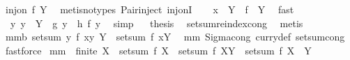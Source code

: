 \begin{isabellebody}
\isamarkupfalse%
\ {\isachardoublequoteopen}inj{\isacharunderscore}on\ {\isacharquery}f\ Y{\isachardoublequoteclose}\ \isamarkupfalse%
\ {\isacharparenleft}metis{\isacharparenleft}no{\isacharunderscore}types{\isacharparenright}\ Pair{\isacharunderscore}inject\ inj{\isacharunderscore}onI{\isacharparenright}\ \isanewline
{}\isamarkupfalse%
\ \isamarkupfalse%
\ {\isachardoublequoteopen}{\isacharbraceleft}x{\isacharbraceright}\ {\isasymtimes}\ Y\ {\isacharequal}\ {\isacharquery}f\ {\isacharbackquote}\ Y{\isachardoublequoteclose}\ \isamarkupfalse%
\ fast\isanewline
{}\isamarkupfalse%
\ \isamarkupfalse%
\ {\isachardoublequoteopen}{\isasymforall}\ y{\isachardot}\ y\ {\isasymin}\ Y\ {\isasymlongrightarrow}\ {\isacharquery}g\ y\ {\isacharequal}\ {\isacharquery}h\ {\isacharparenleft}{\isacharquery}f\ y{\isacharparenright}{\isachardoublequoteclose}\ \isamarkupfalse%
\ simp\isanewline
{}\isamarkupfalse%
\ \isamarkupfalse%
\ {\isacharquery}thesis\ \isamarkupfalse%
\ setsum{\isachardot}reindex{\isacharunderscore}cong\ \isamarkupfalse%
\ metis\isanewline
{}\isamarkupfalse%
%
\endisatagproof
{\isafoldproof}%
%
\isadelimproof
\isanewline
%
\endisadelimproof
\isanewline
{}\isamarkupfalse%
\ mm{}{}b{\isacharcolon}\ {\isachardoublequoteopen}setsum\ {\isacharparenleft}{\isacharpercent}y{\isachardot}\ f\ {\isacharparenleft}x{\isacharcomma}y{\isacharparenright}{\isacharparenright}\ Y\ {\isacharequal}\ setsum\ f\ {\isacharparenleft}{\isacharbraceleft}x{\isacharbraceright}{\isasymtimes}Y{\isacharparenright}{\isachardoublequoteclose}\ \isanewline
%
\isadelimproof
%
\endisadelimproof
%
\isatagproof
{}\isamarkupfalse%
\ mm{}{}\ Sigma{\isacharunderscore}cong\ curry{\isacharunderscore}def\ setsum{\isachardot}cong\ \isamarkupfalse%
\ fastforce%
\endisatagproof
{\isafoldproof}%
%
\isadelimproof
\isanewline
%
\endisadelimproof
\isanewline
{}\isamarkupfalse%
\ mm{}{}{\isacharcolon}\ \ {\isachardoublequoteopen}finite\ X{\isachardoublequoteclose}\ \ {\isachardoublequoteopen}setsum\ f\ X\ {\isacharequal}\ setsum\ f\ {\isacharparenleft}X{\isacharminus}Y{\isacharparenright}\ {\isacharplus}\ {\isacharparenleft}setsum\ f\ {\isacharparenleft}X\ {\isasyminter}\ Y{\isacharparenright}{\isacharparenright}{\isachardoublequoteclose}\ \isanewline

\end{isabellebody}
